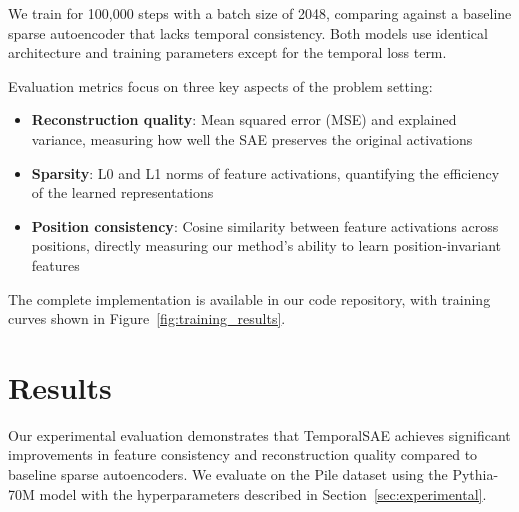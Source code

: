 \documentclass{article} %
\begin{document}
We train for 100,000 steps with a batch size of 2048, comparing against a baseline sparse autoencoder that lacks temporal consistency. Both models use identical architecture and training parameters except for the temporal loss term.

Evaluation metrics focus on three key aspects of the problem setting:
\begin{itemize}
    \item \textbf{Reconstruction quality}: Mean squared error (MSE) and explained variance, measuring how well the SAE preserves the original activations
    \item \textbf{Sparsity}: L0 and L1 norms of feature activations, quantifying the efficiency of the learned representations
    \item \textbf{Position consistency}: Cosine similarity between feature activations across positions, directly measuring our method's ability to learn position-invariant features
\end{itemize}

The complete implementation is available in our code repository, with training curves shown in Figure~\ref{fig:training_results}.

\section{Results}
\label{sec:results}

Our experimental evaluation demonstrates that TemporalSAE achieves significant improvements in feature consistency and reconstruction quality compared to baseline sparse autoencoders. We evaluate on the Pile dataset using the Pythia-70M model with the hyperparameters described in Section~\ref{sec:experimental}.
\end{document}

